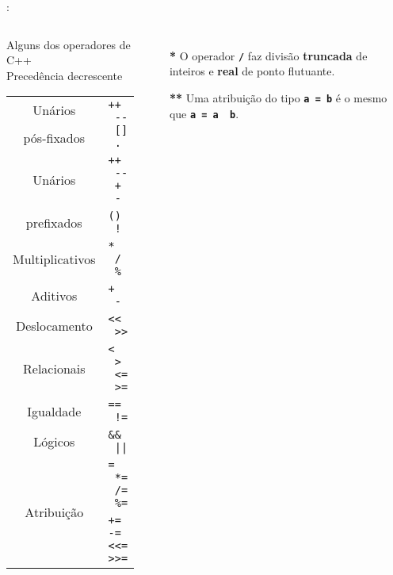 \begin{frame}{\insertsection: \insertsubsection}

	\begin{columns}[b]
		\begin{block}{\centering Alguns dos operadores de C++\\{\small Precedência decrescente}}
			\begin{tabular}{cl}
				Unários      & \multirow{2}{*}{\texttt{++ \ {-}{-} \ [] \ .}} \\
				pós-fixados  &                                                \\ \hline
				Unários      & \texttt{++ \ {-}{-} \ + \ -}                   \\
				prefixados   & \texttt{(\textbf{\HighlightType{tipo}}) \ !}   \\ \hline
				Multiplicativos\Highlight{*} & \texttt{* \ / \ \%}            \\ \hline
				Aditivos     & \texttt{+ \ -}                                 \\ \hline
				Deslocamento & \texttt{{<}{<} \ {>}{>}}                       \\ \hline
				Relacionais  & \texttt{< \ > \ <= \ >=}                       \\ \hline
				Igualdade    & \texttt{== \ !=}                               \\ \hline
				Lógicos      & \texttt{\&\& \ ||}                             \\ \hline
				\multirow{2}{*}{Atribuição\Highlight{**}} & \texttt{= \ *= \ /= \ \%=} \\
				             & \texttt{+= -= <{<}= >{>}=}                     \\ %
			\end{tabular}
		\end{block}

		\begin{itemize}
			\item[\textbf{*}] O operador \textbf{\texttt{/}} faz divisão \textbf{truncada} de inteiros e \textbf{real} de ponto flutuante.
			\item[\textbf{**}] Uma atribuição do tipo \textbf{\texttt{a~=~b}} é o mesmo que \textbf{\texttt{a~=~a~~b}}.
		\end{itemize}
	\end{columns}

\end{frame}

